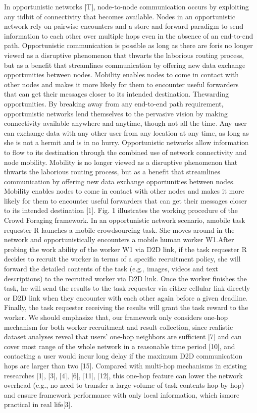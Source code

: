 \documentclass[10pt,journal,compsoc]{IEEEtran}
\begin{document}
In opportunistic networks [T], node-to-node communication occurs by exploiting any tidbit of connectivity that becomes available. Nodes in an opportunistic network rely on pairwise encounters and a store-and-forward paradigm to send information to each other over multiple hops even in the absence of an end-to-end path. Opportunistic communication is possible as long as there are foris no longer viewed as a disruptive phenomenon that thwarts the laborious routing process, but as a benefit that streamlines communication by offering new data exchange opportunities between nodes. Mobility enables nodes to come in contact with other nodes and makes it more likely for them to encounter useful forwarders that can get their messages closer to its intended destination.
Thewarding opportunities. By breaking away from any end-to-end path requirement, opportunistic networks lend themselves to the pervasive vision by making connectivity available anywhere and anytime, though not all the time. Any user can exchange data with any other user from any location at any time, as long as she is not a hermit and is in no hurry. Opportunistic networks allow information to flow to its destination through the combined use of network connectivity and node mobility. Mobility is no longer viewed as a disruptive phenomenon that thwarts the laborious routing process, but as a benefit that streamlines communication by offering new data exchange opportunities between nodes. Mobility enables nodes to come in contact with other nodes and makes it more likely for them to encounter useful forwarders that can get their messages closer to its intended destination [1].
Fig. 1 illustrates the working procedure of the Crowd Foraging framework. In an opportunistic network scenario, amobile task requester R launches a mobile crowdsourcing task. She moves around in the network and opportunistically encounters a mobile human worker W1.After probing the work ability of the worker W1 via D2D link, if the task requester R decides to recruit the worker in terms of a specific recruitment policy, she will forward the detailed contents of the task (e.g., images, videos and text descriptions) to the recruited worker via D2D link. Once the worker finishes the task, he will send the results to the task requester via either cellular link directly or D2D link when they encounter with each other again before a given deadline. Finally, the task requester receiving the results will grant the task reward to the worker. We should emphasize that, our framework only considers one-hop mechanism for both worker recruitment and result collection, since realistic dataset analyses reveal that users’ one-hop neighbors are sufficient [7] and can cover most range of the whole network in a reasonable time period [10], and contacting a user would incur long delay if the maximum D2D communication hops are larger than two [15]. Compared with multi-hop mechanisms in existing researches [1], [3], [4], [6], [11], [12], this one-hop feature can lower the network overhead (e.g., no need to transfer a large volume of task contents hop by hop) and ensure framework performance with only local information, which ismore practical in real life[3].
\end{document}
